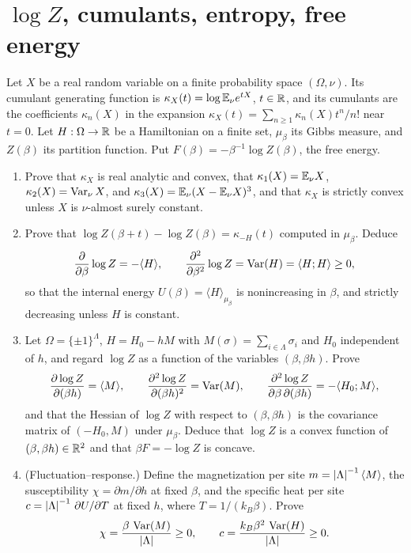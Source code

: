\section{\texorpdfstring{$\log Z$}{log Z}, cumulants, entropy, free energy}

\begin{exercise}
Let $X$ be a real random variable on a finite probability space
$(\Omega,\nu)$.  Its cumulant generating function is
$\kappa_X(t)=\log\mathbb E_\nu e^{tX}$, $t\in\mathbb R$, and its cumulants are the
coefficients $\kappa_n(X)$ in the expansion $\kappa_X(t)=\sum_{n\ge1}\kappa_n(X)t^n/n!$ near $t=0$.
Let $H:\Omega\to\mathbb R$ be a Hamiltonian on a finite set, $\mu_\beta$ its Gibbs
measure, and $Z(\beta)$ its partition function. Put $F(\beta)=-\beta^{-1}\log Z(\beta)$, the free energy.
\begin{enumerate}[label=(\alph*)]
\item Prove that $\kappa_X$ is real analytic and convex, that
$\kappa_1(X)=\mathbb E_\nu X$, $\kappa_2(X)=\operatorname{Var}_\nu X$, and
$\kappa_3(X)=\mathbb E_\nu(X-\mathbb E_\nu X)^3$, and that $\kappa_X$ is strictly convex
unless $X$ is $\nu$-almost surely constant.
\item Prove that $\log Z(\beta+t)-\log Z(\beta)=\kappa_{-H}(t)$ computed in
$\mu_\beta$.  Deduce
\[
 \frac{\partial}{\partial\beta}\log Z=-\langle H\rangle,\qquad
 \frac{\partial^2}{\partial\beta^2}\log Z=\operatorname{Var}(H)=\langle H;H\rangle\ge0,
\]
so that the internal energy $U(\beta)=\langle H\rangle_{\mu_\beta}$ is
nonincreasing in $\beta$, and strictly decreasing unless $H$ is constant.
\item Let $\Omega=\{\pm1\}^\Lambda$, $H=H_0-hM$ with $M(\sigma)=\sum_{i\in\Lambda}\sigma_i$
and $H_0$ independent of $h$, and regard $\log Z$ as a function of the
variables $(\beta,\beta h)$.  Prove
\[
 \frac{\partial\log Z}{\partial(\beta h)}=\langle M\rangle,\qquad
 \frac{\partial^2\log Z}{\partial(\beta h)^2}=\operatorname{Var}(M),\qquad
 \frac{\partial^2\log Z}{\partial\beta\,\partial(\beta h)}=-\langle H_0;M\rangle ,
\]
and that the Hessian of $\log Z$ with respect to $(\beta,\beta h)$ is the
covariance matrix of $(-H_0,M)$ under $\mu_\beta$.  Deduce that $\log Z$ is a
convex function of $(\beta,\beta h)\in\mathbb R^2$ and that $\beta F=-\log Z$ is
concave.
\item (Fluctuation--response.)  Define the magnetization per site
$m=\left\lvert \Lambda\right\rvert^{-1}\langle M\rangle$, the susceptibility
$\chi=\partial m/\partial h$ at fixed $\beta$, and the specific heat per site
$c=\left\lvert \Lambda\right\rvert^{-1}\,\partial U/\partial T$ at fixed $h$, where
$T=1/(k_B\beta)$.  Prove
\[
 \chi=\frac{\beta\,\operatorname{Var}(M)}{\left\lvert \Lambda\right\rvert}\ge0,\qquad
 c=\frac{k_B\beta^2\,\operatorname{Var}(H)}{\left\lvert \Lambda\right\rvert}\ge0 .
\]
\end{enumerate}
\end{exercise}

